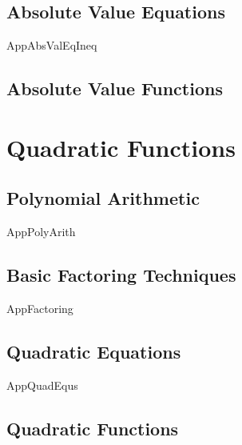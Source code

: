 \section{Absolute Value Equations}

{AppAbsValEqIneq}

\newpage

\section{Absolute Value Functions}



\newpage

\chapter{Quadratic Functions}

\section{Polynomial Arithmetic}

{AppPolyArith}

\newpage

\section{Basic Factoring Techniques}

{AppFactoring}

\newpage

\section{Quadratic Equations}

{AppQuadEqus}

\newpage

\section{Quadratic Functions}


\newpage
